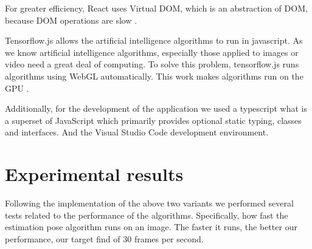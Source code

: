 For greater efficiency, React uses Virtual DOM, which is an abstraction of DOM, because DOM operations are slow \cite{virtual-dom-react}.

Tensorflow.js allows the artificial intelligence algorithms to run in javascript.
As we know artificial intelligence algorithms, especially those applied to images or video need a great deal of computing.
To solve this problem, tensorflow.js runs algorithms using WebGL automatically.
This work makes algorithms run on the GPU \cite{tensorflow.js}.

Additionally, for the development of the application we used a typescript what is a superset of JavaScript which primarily provides optional static typing, classes and interfaces. And the Visual Studio Code development environment.

\section{Experimental results}

Following the implementation of the above two variants we performed several tests related to the performance of the algorithms.
Specifically, how fast the estimation pose algorithm runs on an image. The faster it runs, the better our performance, our target find of 30 frames per second.

